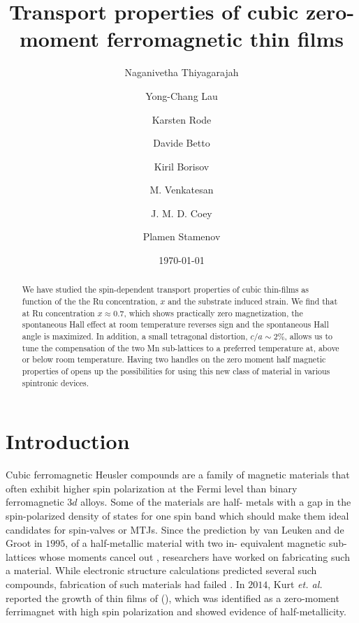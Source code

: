 \documentclass[reprint,aip,apl,floatfix,linenumbers,superscriptaddress]{revtex4-1}
\begin{document}
\title{Transport properties of cubic zero-moment ferromagnetic  thin films}
\author{Naganivetha Thiyagarajah}
\author{Yong-Chang Lau}
\author{Karsten Rode}
\author{Davide Betto}
\author{Kiril Borisov}
\author{M. Venkatesan}
\author{J. M. D. Coey}
\author{Plamen Stamenov}

\date{\today}

\begin{abstract}
We have studied the spin-dependent transport properties of cubic  thin-films as function of the the Ru concentration, $x$ and the substrate 
induced strain. We find that at Ru concentration $x\approx\num{0.7}$, which 
shows practically zero magnetization, the spontaneous Hall effect at room 
temperature reverses sign and the spontaneous Hall angle is maximized. In 
addition, a small tetragonal distortion, $c/a\sim\num{2}\%$, allows us to 
tune the compensation of the two Mn sub-lattices to a preferred temperature 
at, above or below room temperature. Having two handles on the zero moment 
half magnetic properties of  opens up the possibilities for 
using this new class of material in various spintronic devices. 

\end{abstract}
\maketitle

\section{Introduction}
\label{sec:intro}

Cubic ferromagnetic Heusler compounds are a family of magnetic materials that 
often exhibit higher spin polarization at the Fermi level than binary 
ferromagnetic $3d$ alloys\cite{Graf2013}. Some of the materials are half-
metals with a gap in the spin-polarized density of states for one spin band 
which should make them ideal candidates for spin-valves or MTJs\cite{PhysRevB.
28.1745,Wang2009,Takahashi2011,Tsunegi2008}.  Since the prediction by van 
Leuken and de Groot in $1995$, of a half-metallic material with two in-
equivalent magnetic sub-lattices whose moments cancel out \cite{PhysRevLett.50
.2024}, researchers have worked on fabricating such a material. While 
electronic structure calculations predicted several such compounds\cite{
Wurmehl2006, Hu2012, Galanakis2006}, fabrication of such materials had failed
\cite{Hu2012,PhysRevB.79.100406}. In $2014$, Kurt \textit{et. al.} reported 
the growth of thin films of  (), which was identified 
as a zero-moment ferrimagnet with high spin polarization and showed evidence 
of half-metallicity\cite{KurtPRL2014}. 
\end{document}
